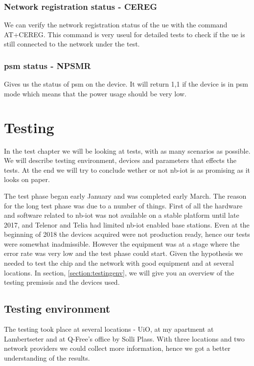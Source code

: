 \documentclass[USenglish]{ifimaster}  %
\begin{document}
\subsection{Network registration status - CEREG}
We can verify the network registration status of the \acrshort{ue} with the command AT+CEREG. This command is very useul for detailed tests to check if the \acrshort{ue} is still connected to the network under the test.

\subsection{\acrshort{psm} status - NPSMR}
Gives us the status of \acrshort{psm} on the device. It will return 1,1 if the device is in \acrshort{psm} mode which means that the power usage should be very low.

\chapter{Testing} \label{section:testing}
In the test chapter we will be looking at tests, with as many scenarios as possible. We will describe testing environment, devices and parameters that effects the tests. At the end we will try to conclude wether or not \acrshort{nb-iot} is as promising as it looks on paper.

The test phase began early January and was completed early March. The reason for the long test phase was due to a number of things. First of all the hardware and software related to \acrshort{nb-iot} was not available on a stable platform until late 2017, and Telenor and Telia had limited \acrshort{nb-iot} enabled base stations. Even at the beginning of 2018 the devices acquired were not production ready, hence our tests were somewhat inadmissible. However the equipment was at a stage where the error rate was very low and the test phase could start. Given the hypothesis we needed to test the chip and the network with good equipment and at several locations. In section, \vref{section:testingenv}, we will give you an overview of the testing premissis and the devices used.

\section{Testing environment} \label{section:testingenv}
The testing took place at several locations - UiO, at my apartment at Lambertseter and at Q-Free's office by Solli Plass. With three locations and two network providers we could collect more information, hence we got a better understanding of the results.
\end{document}
